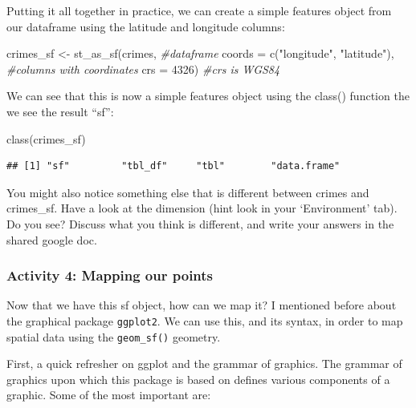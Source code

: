 \documentclass[
]{book}
\newenvironment{Shaded}{\begin{snugshade}}{\end{snugshade}}
\newcommand{\AttributeTok}[1]{\textcolor[rgb]{0.77,0.63,0.00}{#1}}
\newcommand{\CommentTok}[1]{\textcolor[rgb]{0.56,0.35,0.01}{\textit{#1}}}
\newcommand{\DecValTok}[1]{\textcolor[rgb]{0.00,0.00,0.81}{#1}}
\newcommand{\FunctionTok}[1]{\textcolor[rgb]{0.00,0.00,0.00}{#1}}
\newcommand{\NormalTok}[1]{#1}
\newcommand{\OtherTok}[1]{\textcolor[rgb]{0.56,0.35,0.01}{#1}}
\newcommand{\StringTok}[1]{\textcolor[rgb]{0.31,0.60,0.02}{#1}}
\begin{document}
Putting it all together in practice, we can create a simple features object from our dataframe using the latitude and longitude columns:

\begin{Shaded}
\begin{Highlighting}[]
\NormalTok{crimes\_sf }\OtherTok{\textless{}{-}} \FunctionTok{st\_as\_sf}\NormalTok{(crimes,                                     }\CommentTok{\#dataframe}
                      \AttributeTok{coords =} \FunctionTok{c}\NormalTok{(}\StringTok{"longitude"}\NormalTok{, }\StringTok{"latitude"}\NormalTok{),        }\CommentTok{\#columns with coordinates}
                      \AttributeTok{crs =} \DecValTok{4326}\NormalTok{)                                 }\CommentTok{\#crs is WGS84}
\end{Highlighting}
\end{Shaded}

We can see that this is now a simple features object using the class() function the we see the result ``sf'':

\begin{Shaded}
\begin{Highlighting}[]
\FunctionTok{class}\NormalTok{(crimes\_sf)}
\end{Highlighting}
\end{Shaded}

\begin{verbatim}
## [1] "sf"         "tbl_df"     "tbl"        "data.frame"
\end{verbatim}

You might also notice something else that is different between crimes and crimes\_sf. Have a look at the dimension (hint look in your `Environment' tab). Do you see? Discuss what you think is different, and write your answers in the shared google doc.

\hypertarget{activity-4-mapping-our-points}{%
\subsubsection{Activity 4: Mapping our points}\label{activity-4-mapping-our-points}}

Now that we have this sf object, how can we map it? I mentioned before about the graphical package \texttt{ggplot2}. We can use this, and its syntax, in order to map spatial data using the \texttt{geom\_sf()} geometry.

First, a quick refresher on ggplot and the grammar of graphics. The grammar of graphics upon which this package is based on defines various components of a graphic. Some of the most important are:
\end{document}
